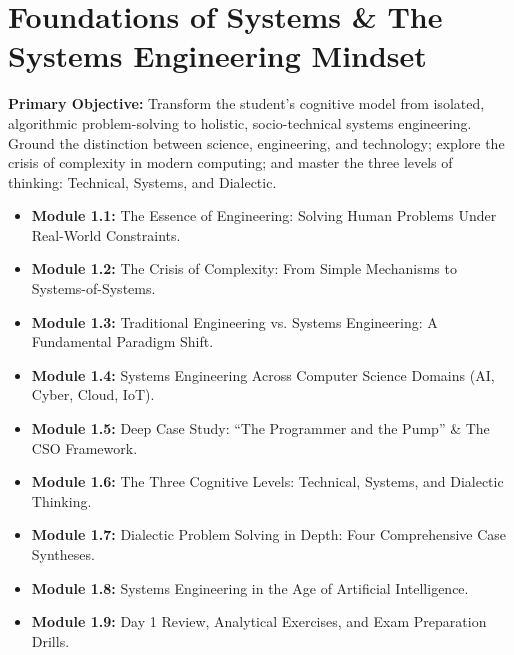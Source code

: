 \chapter{Foundations of Systems \& The Systems Engineering Mindset}
\label{chap:day1}

\begin{tcolorbox}[colback=sePrimary!5!white,colframe=sePrimary,title={\sffamily \textbf{DAY 1 CURRICULUM OVERVIEW \& LEARNING TARGETS}}]
\small
\textbf{Primary Objective:} Transform the student's cognitive model from isolated, algorithmic problem-solving to holistic, socio-technical systems engineering. Ground the distinction between science, engineering, and technology; explore the crisis of complexity in modern computing; and master the three levels of thinking: Technical, Systems, and Dialectic.
\begin{itemize}[leftmargin=1.5em, itemsep=2pt]
    \item \textbf{Module 1.1:} The Essence of Engineering: Solving Human Problems Under Real-World Constraints.
    \item \textbf{Module 1.2:} The Crisis of Complexity: From Simple Mechanisms to Systems-of-Systems.
    \item \textbf{Module 1.3:} Traditional Engineering vs. Systems Engineering: A Fundamental Paradigm Shift.
    \item \textbf{Module 1.4:} Systems Engineering Across Computer Science Domains (AI, Cyber, Cloud, IoT).
    \item \textbf{Module 1.5:} Deep Case Study: ``The Programmer and the Pump'' \& The CSO Framework.
    \item \textbf{Module 1.6:} The Three Cognitive Levels: Technical, Systems, and Dialectic Thinking.
    \item \textbf{Module 1.7:} Dialectic Problem Solving in Depth: Four Comprehensive Case Syntheses.
    \item \textbf{Module 1.8:} Systems Engineering in the Age of Artificial Intelligence.
    \item \textbf{Module 1.9:} Day 1 Review, Analytical Exercises, and Exam Preparation Drills.
\end{itemize}
\end{tcolorbox}

